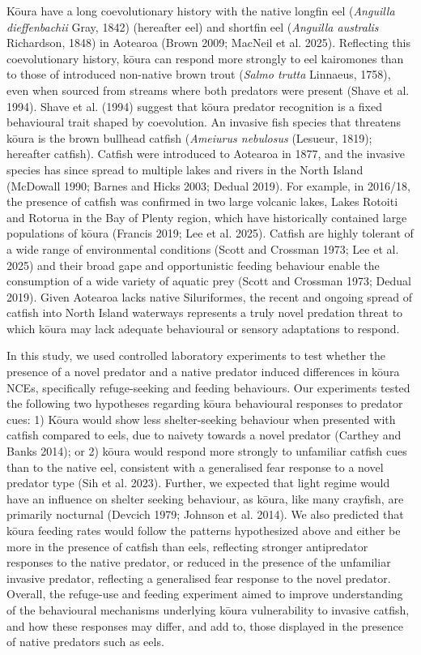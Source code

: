 \documentclass[
  12pt,
  a4paper,
  oneside]{scrbook}
\begin{document}
Kōura have a long coevolutionary history with the native longfin eel
(\emph{Anguilla dieffenbachii} Gray, 1842) (hereafter eel) and shortfin
eel (\emph{Anguilla australis} Richardson, 1848) in Aotearoa (Brown
2009; MacNeil et al. 2025). Reflecting this coevolutionary history,
kōura can respond more strongly to eel kairomones than to those of
introduced non-native brown trout (\emph{Salmo trutta} Linnaeus, 1758),
even when sourced from streams where both predators were present (Shave
et al. 1994). Shave et al. (1994) suggest that kōura predator
recognition is a fixed behavioural trait shaped by coevolution. An
invasive fish species that threatens kōura is the brown bullhead catfish
(\emph{Ameiurus nebulosus} (Lesueur, 1819); hereafter catfish). Catfish
were introduced to Aotearoa in 1877, and the invasive species has since
spread to multiple lakes and rivers in the North Island (McDowall 1990;
Barnes and Hicks 2003; Dedual 2019). For example, in 2016/18, the
presence of catfish was confirmed in two large volcanic lakes, Lakes
Rotoiti and Rotorua in the Bay of Plenty region, which have historically
contained large populations of kōura (Francis 2019; Lee et al. 2025).
Catfish are highly tolerant of a wide range of environmental conditions
(Scott and Crossman 1973; Lee et al. 2025) and their broad gape and
opportunistic feeding behaviour enable the consumption of a wide variety
of aquatic prey (Scott and Crossman 1973; Dedual 2019). Given Aotearoa
lacks native Siluriformes, the recent and ongoing spread of catfish into
North Island waterways represents a truly novel predation threat to
which kōura may lack adequate behavioural or sensory adaptations to
respond.

In this study, we used controlled laboratory experiments to test whether
the presence of a novel predator and a native predator induced
differences in kōura NCEs, specifically refuge-seeking and feeding
behaviours. Our experiments tested the following two hypotheses
regarding kōura behavioural responses to predator cues: 1) Kōura would
show less shelter-seeking behaviour when presented with catfish compared
to eels, due to naivety towards a novel predator (Carthey and Banks
2014); or 2) kōura would respond more strongly to unfamiliar catfish
cues than to the native eel, consistent with a generalised fear response
to a novel predator type (Sih et al. 2023). Further, we expected that
light regime would have an influence on shelter seeking behaviour, as
kōura, like many crayfish, are primarily nocturnal (Devcich 1979;
Johnson et al. 2014). We also predicted that kōura feeding rates would
follow the patterns hypothesized above and either be more in the
presence of catfish than eels, reflecting stronger antipredator
responses to the native predator, or reduced in the presence of the
unfamiliar invasive predator, reflecting a generalised fear response to
the novel predator. Overall, the refuge-use and feeding experiment aimed
to improve understanding of the behavioural mechanisms underlying kōura
vulnerability to invasive catfish, and how these responses may differ,
and add to, those displayed in the presence of native predators such as
eels.
\end{document}

